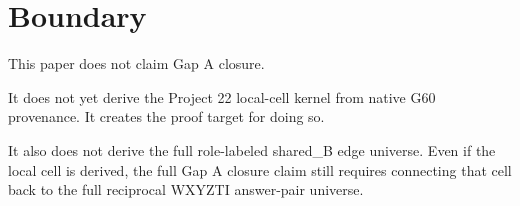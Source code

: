 \section{Boundary}

This paper does not claim Gap A closure.

It does not yet derive the Project 22 local-cell kernel from native G60 provenance.  It creates the proof target for doing so.

It also does not derive the full role-labeled shared\_B edge universe.  Even if the local cell is derived, the full Gap A closure claim still requires connecting that cell back to the full reciprocal WXYZTI answer-pair universe.
